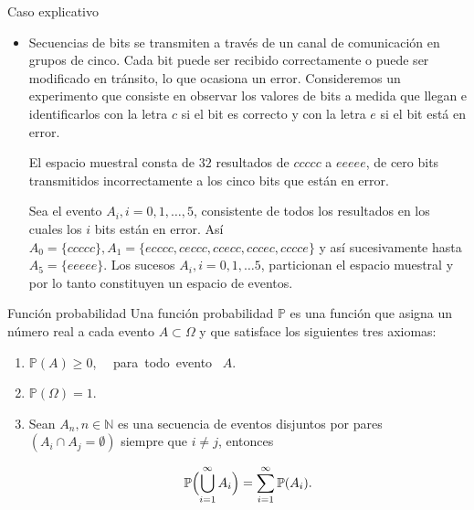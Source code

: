 \documentclass{beamer}
\begin{document}
\begin{frame}{Caso explicativo}
\begin{itemize}
\item \small{Secuencias de bits se transmiten a trav\'es de un canal de comunicaci\'on en grupos de cinco. Cada bit puede ser recibido correctamente o puede  ser modificado en tr\'ansito, lo que ocasiona un error. Consideremos un experimento que consiste en observar los valores de bits a medida que llegan e identificarlos con la letra $c$ si el bit es correcto y con la letra $e$ si el bit est\'a en error.} 

\vspace{0.2cm}

\scriptsize{El espacio muestral consta de $32$ resultados de $ccccc$ a $eeeee$, de cero bits transmitidos incorrectamente a los cinco bits que est\'an en error.
	
\vspace{0.2cm}
	
Sea el evento $A_i, i = 0,1, \dots, 5$, consistente de todos los resultados en los cuales los $i$ bits est\'an en error.  As\'i $A_0 = \{ccccc\}, A_1 = \{ecccc, ceccc, ccecc, cccec, cccce\}$ y as\'i sucesivamente hasta $A_5 = \{eeeee\}$. Los sucesos $A_i, i = 0, 1,\dots 5$, particionan el espacio muestral y por lo tanto constituyen un espacio de eventos.}



\end{itemize}
\end{frame}

\begin{frame}{Funci\'on  probabilidad}
Una funci\'on  probabilidad $\mathbb{P}$ es una funci\'on que asigna un n\'umero real a cada evento $A \subset \Omega$ y que satisface los siguientes tres axiomas:

\begin{enumerate}
	\item $\mathbb{P}(A) \geq 0$, \ \ \mbox{para todo evento}  \ $A$.
	\item $\mathbb{P}(\Omega) = 1$.
	\item Sean $A_n, n \in \mathbb{N}$ es una secuencia de eventos disjuntos  por pares $(A_i \cap A_j = \emptyset)$ siempre que $i \neq j$, entonces
	
	\[
	\mathbb{P}\Bigl(\bigcup\limits_{i= 1}^{\infty}A_i \Bigr) = \sum_{i = 1}^{\infty}\mathbb{P}(A_i).
	\]
\end{enumerate}
\end{frame}
\end{document}
